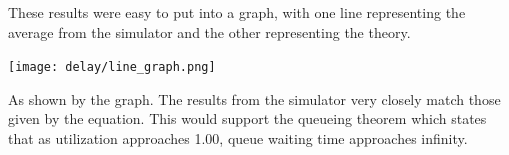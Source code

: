 \documentclass[11pt]{article}
\begin{document}
\vspace{5mm}

These results were easy to put into a graph, with one line representing the average from the simulator and the other representing the theory.

\texttt{[image: delay/line\_graph.png]}

As shown by the graph. The results from the simulator very closely match those given by the equation. This would support the queueing theorem which states that as utilization approaches 1.00, queue waiting time approaches infinity.
\end{document}
